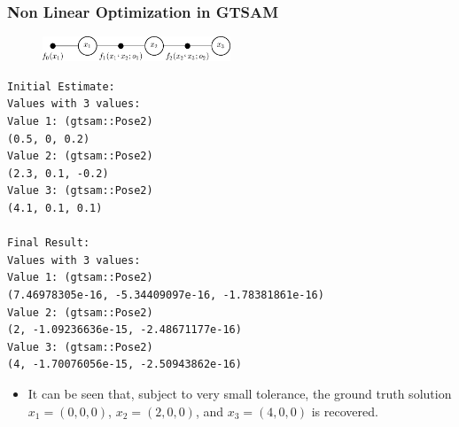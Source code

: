 \begin{frame}[fragile]
    \frametitle{Non Linear Optimization in GTSAM}

    \scriptsize

    \begin{figure}[!h]
        \includegraphics[width=0.5\textwidth]{./images/gtsam/factor_graph_odometry.pdf}
    \end{figure}
\begin{lstlisting}[style=python] 
Initial Estimate:
Values with 3 values:
Value 1: (gtsam::Pose2)
(0.5, 0, 0.2)
Value 2: (gtsam::Pose2)
(2.3, 0.1, -0.2)
Value 3: (gtsam::Pose2)
(4.1, 0.1, 0.1)

Final Result:
Values with 3 values:
Value 1: (gtsam::Pose2)
(7.46978305e-16, -5.34409097e-16, -1.78381861e-16)
Value 2: (gtsam::Pose2)
(2, -1.09236636e-15, -2.48671177e-16)
Value 3: (gtsam::Pose2)
(4, -1.70076056e-15, -2.50943862e-16)
\end{lstlisting}

    \begin{itemize}
        \item It can be seen that, subject to very small tolerance, the ground truth solution $x_1 = (0,0,0)$, $x_2 = (2,0,0)$, and $x_3 = (4,0,0)$ is recovered.
    \end{itemize}

\end{frame}


